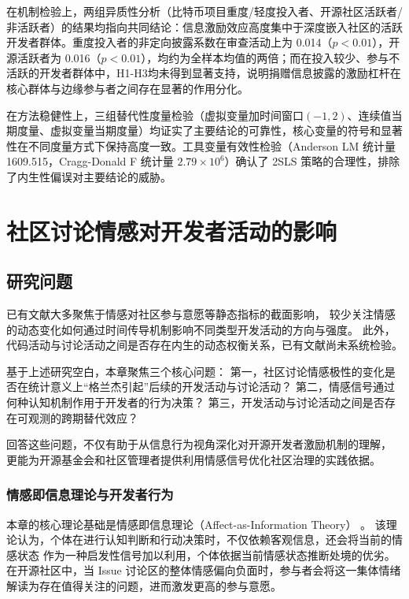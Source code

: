 \documentclass[
    type = master, %
    degree = professional,        %
    decl-page,  %
    twoside,                %
    fontset = fandol %
  ]{njuthesis}
\begin{document}
在机制检验上，两组异质性分析（比特币项目重度/轻度投入者、开源社区活跃者/非活跃者）的结果均指向共同结论：信息激励效应高度集中于深度嵌入社区的活跃开发者群体。重度投入者的非定向披露系数在审查活动上为 0.014（$p < 0.01$），开源活跃者为 0.016（$p < 0.01$），均约为全样本均值的两倍；而在投入较少、参与不活跃的开发者群体中，H1-H3均未得到显著支持，说明捐赠信息披露的激励杠杆在核心群体与边缘参与者之间存在显著的作用分化。

在方法稳健性上，三组替代性度量检验（虚拟变量加时间窗口$(-1, 2)$、连续值当期度量、虚拟变量当期度量）均证实了主要结论的可靠性，核心变量的符号和显著性在不同度量方式下保持高度一致。工具变量有效性检验（Anderson LM 统计量 1609.515，Cragg-Donald F 统计量 $2.79 \times 10^6$）确认了 2SLS 策略的合理性，排除了内生性偏误对主要结论的威胁。



\chapter{社区讨论情感对开发者活动的影响}

\section{研究问题}

已有文献大多聚焦于情感对社区参与意愿等静态指标的截面影响，
较少关注情感的动态变化如何通过时间传导机制影响不同类型开发活动的方向与强度。
此外，代码活动与讨论活动之间是否存在内生的动态权衡关系，已有文献尚未系统检验。

基于上述研究空白，本章聚焦三个核心问题：
第一，社区讨论情感极性的变化是否在统计意义上“格兰杰引起”后续的开发活动与讨论活动？
第二，情感信号通过何种认知机制作用于开发者的行为决策？
第三，开发活动与讨论活动之间是否存在可观测的跨期替代效应？

回答这些问题，不仅有助于从信息行为视角深化对开源开发者激励机制的理解，
更能为开源基金会和社区管理者提供利用情感信号优化社区治理的实践依据。


\subsection{情感即信息理论与开发者行为}

本章的核心理论基础是情感即信息理论（Affect-as-Information Theory）
\cite{schwarz1983moods}。
该理论认为，个体在进行认知判断和行动决策时，不仅依赖客观信息，还会将当前的情感状态
作为一种启发性信号加以利用，个体依据当前情感状态推断处境的优劣。在开源社区中，当 Issue 讨论区的整体情感偏向负面时，参与者会将这一集体情绪解读为存在值得关注的问题，进而激发更高的参与意愿。
\end{document}
